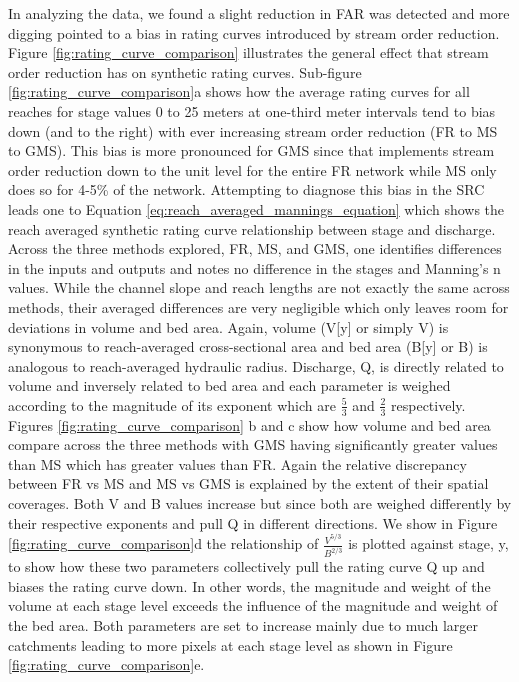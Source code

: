 In analyzing the data, we found a slight reduction in FAR was detected and more digging pointed to a bias in rating curves introduced by stream order reduction.
Figure \ref{fig:rating_curve_comparison} illustrates the general effect that stream order reduction has on synthetic rating curves.
Sub-figure \ref{fig:rating_curve_comparison}a shows how the average rating curves for all reaches for stage values 0 to 25 meters at one-third meter intervals tend to bias down (and to the right) with ever increasing stream order reduction (FR to MS to GMS). 
This bias is more pronounced for GMS since that implements stream order reduction down to the unit level for the entire FR network while MS only does so for 4-5\% of the network.
Attempting to diagnose this bias in the SRC leads one to Equation \ref{eq:reach_averaged_mannings_equation} which shows the reach averaged synthetic rating curve relationship between stage and discharge.
Across the three methods explored, FR, MS, and GMS, one identifies differences in the inputs and outputs and notes no difference in the stages and Manning's n values.
While the channel slope and reach lengths are not exactly the same across methods, their averaged differences are very negligible which only leaves room for deviations in volume and bed area.
Again, volume (V[y] or simply V) is synonymous to reach-averaged cross-sectional area and bed area (B[y] or B) is analogous to reach-averaged hydraulic radius.
Discharge, Q, is directly related to volume and inversely related to bed area and each parameter is weighed according to the magnitude of its exponent which are $\frac{5}{3}$ and $\frac{2}{3}$ respectively. 
Figures \ref{fig:rating_curve_comparison} b and c show how volume and bed area compare across the three methods with GMS having significantly greater values than MS which has greater values than FR.
Again the relative discrepancy between FR vs MS and MS vs GMS is explained by the extent of their spatial coverages.
Both V and B values increase but since both are weighed differently by their respective exponents and pull Q in different directions.
We show in Figure \ref{fig:rating_curve_comparison}d the relationship of $\frac{V^{5/3}}{B^{2/3}}$ is plotted against stage, y, to show how these two parameters collectively pull the rating curve Q up and biases the rating curve down.
In other words, the magnitude and weight of the volume at each stage level exceeds the influence of the magnitude and weight of the bed area.
Both parameters are set to increase mainly due to much larger catchments leading to more pixels at each stage level as shown in Figure \ref{fig:rating_curve_comparison}e.
